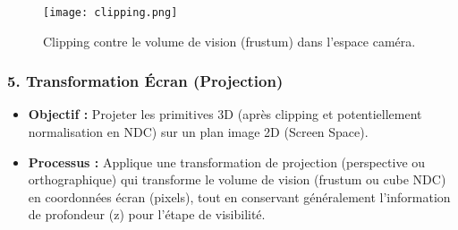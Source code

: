 \documentclass{article}
\begin{document}
\begin{figure}[H]
\centering
\texttt{[image: clipping.png]}
\caption{Clipping contre le volume de vision (frustum) dans l'espace caméra.}
\label{fig:clipping}
\end{figure}

\subsubsection{5. Transformation Écran (Projection)}
\begin{itemize}
    \item \textbf{Objectif :} Projeter les primitives 3D (après clipping et potentiellement normalisation en NDC) sur un plan image 2D (Screen Space).
    \item \textbf{Processus :} Applique une transformation de projection (perspective ou orthographique) qui transforme le volume de vision (frustum ou cube NDC) en coordonnées écran (pixels), tout en conservant généralement l'information de profondeur (z) pour l'étape de visibilité.
\end{itemize}
\end{document}
